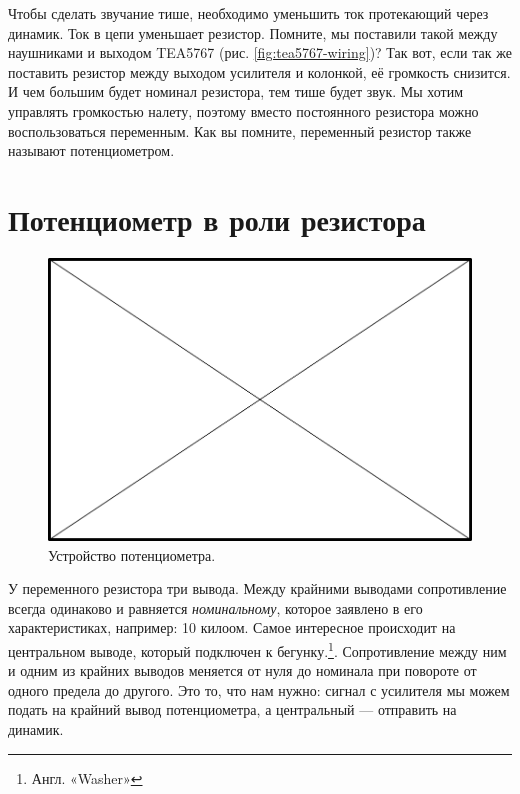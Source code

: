 Чтобы сделать звучание тише, необходимо уменьшить ток протекающий через динамик. Ток в цепи уменьшает резистор. Помните, мы поставили такой между наушниками и выходом TEA5767 (рис. \ref{fig:tea5767-wiring})? Так вот, если так же поставить резистор между выходом усилителя и колонкой, её громкость снизится. И чем большим будет номинал резистора, тем тише будет звук. Мы хотим управлять громкостью налету, поэтому вместо постоянного резистора можно воспользоваться переменным. Как вы помните, переменный резистор также называют потенциометром.

\section{Потенциометр в роли резистора}


\begin{figure}
  \centering
  \includegraphics{TODO.png}
  \caption{Устройство потенциометра.}
  \label{fig:pot-internals}
\end{figure}

У переменного резистора три вывода. Между крайними выводами сопротивление всегда одинаково и равняется \emph{номинальному}, которое заявлено в его характеристиках, например: 10 килоом. Самое интересное происходит на центральном выводе, который подключен к бегунку.\footnote{Англ. «Washer»}. Сопротивление между ним и одним из крайних выводов меняется от нуля до номинала при повороте от одного предела до другого. Это то, что нам нужно: сигнал с усилителя мы можем подать на крайний вывод потенциометра, а центральный — отправить на динамик.

